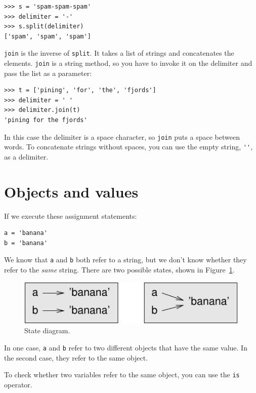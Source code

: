 \documentclass[10pt]{book}
\begin{document}
\begin{verbatim}
>>> s = 'spam-spam-spam'
>>> delimiter = '-'
>>> s.split(delimiter)
['spam', 'spam', 'spam']
\end{verbatim}
%
{\tt join} is the inverse of {\tt split}.  It
takes a list of strings and
concatenates the elements.  {\tt join} is a string method,
so you have to invoke it on the delimiter and pass the
list as a parameter:

\begin{verbatim}
>>> t = ['pining', 'for', 'the', 'fjords']
>>> delimiter = ' '
>>> delimiter.join(t)
'pining for the fjords'
\end{verbatim}
%
In this case the delimiter is a space character, so
{\tt join} puts a space between words.  To concatenate
strings without spaces, you can use the empty string,
\verb"''", as a delimiter.


\section{Objects and values}

If we execute these assignment statements:

\begin{verbatim}
a = 'banana'
b = 'banana'
\end{verbatim}
%
We know that {\tt a} and {\tt b} both refer to a
string, but we don't
know whether they refer to the {\em same} string.
There are two possible states, shown in Figure~\ref{fig.list1}.

\begin{figure}
\centerline
{\includegraphics[scale=0.8]{figs/list1.pdf}}
\caption{State diagram.}
\label{fig.list1}
\end{figure}


In one case, {\tt a} and {\tt b} refer to two different objects that
have the same value.  In the second case, they refer to the same
object.

To check whether two variables refer to the same object, you can
use the {\tt is} operator.
\end{document}
